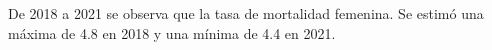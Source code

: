 De 2018 a 2021 se observa que la tasa de mortalidad femenina. Se estimó una máxima de 4.8 en 2018 y una mínima de 4.4 en 2021. 